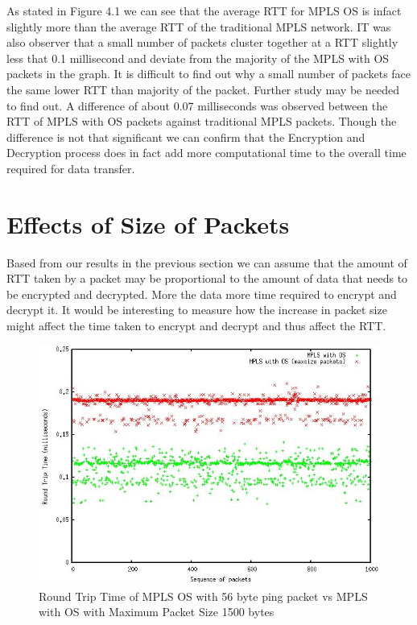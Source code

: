     As stated in Figure 4.1 we can see that the average RTT for MPLS OS is infact slightly more than the average RTT of the traditional MPLS network. IT was also observer that a small number of packets cluster together at a RTT slightly less that 0.1 millisecond and deviate from the majority of the MPLS with OS packets in the graph. It is difficult to find out why a small number of packets face the same lower RTT than majority of the packet. Further study may be needed to find out. A difference of about 0.07 milliseconds was observed between the RTT of MPLS with OS packets against traditional MPLS packets. Though the difference is not that significant we can confirm that the Encryption and Decryption process does in fact add more computational time to the overall time required for data transfer.
    
\section{Effects of Size of Packets}
Based from our results in the previous section we can assume that the amount of RTT taken by a packet may be proportional to the amount of data that needs to be encrypted and decrypted. More the data more time required to encrypt and decrypt it. It would be interesting to measure how the increase in packet size might affect the time taken to encrypt and decrypt and thus affect the RTT.


\begin{figure}[H]
       \centering\includegraphics[width=\textwidth]{images/19_MAXOSvsOS.JPG}
       \caption{Round Trip Time of MPLS OS with 56 byte ping packet vs MPLS with OS with Maximum Packet Size 1500 bytes}
       \label{fig:compbest}
\end{figure}

